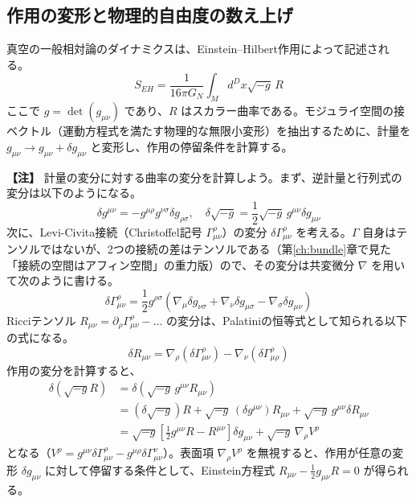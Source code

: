 \documentclass[uplatex, dvipdfmx, book]{jsbook}
\let\origsubsection\subsection
\let\origsubsubsection\subsubsection
\renewcommand{\section}{\origsubsection}
\renewcommand{\subsection}{\origsubsubsection}
\renewcommand{\subsubsection}{\paragraph}
\newenvironment{note}{\vspace{1ex}\par\footnotesize\noindent\textbf{【注】}}{\par\vspace{1ex}}
\begin{document}
\section{作用の変形と物理的自由度の数え上げ}

真空の一般相対論のダイナミクスは、Einstein--Hilbert作用によって記述される。
\begin{equation}
    S_{EH} = \frac{1}{16\pi G_N} \int_M d^D x \sqrt{-g}\, R
\end{equation}
ここで $g = \det(g_{\mu\nu})$ であり、$R$ はスカラー曲率である。モジュライ空間の接ベクトル（運動方程式を満たす物理的な無限小変形）を抽出するために、計量を $g_{\mu\nu} \to g_{\mu\nu} + \delta g_{\mu\nu}$ と変形し、作用の停留条件を計算する。

\begin{note}
計量の変分に対する曲率の変分を計算しよう。まず、逆計量と行列式の変分は以下のようになる。
\begin{equation*}
    \delta g^{\mu\nu} = - g^{\mu\rho} g^{\nu\sigma} \delta g_{\rho\sigma}, \quad \delta \sqrt{-g} = \frac{1}{2} \sqrt{-g}\, g^{\mu\nu} \delta g_{\mu\nu}
\end{equation*}
次に、Levi-Civita接続（Christoffel記号 $\Gamma^\rho_{\mu\nu}$）の変分 $\delta \Gamma^\rho_{\mu\nu}$ を考える。$\Gamma$ 自身はテンソルではないが、2つの接続の差はテンソルである（第\ref{ch:bundle}章で見た「接続の空間はアフィン空間」の重力版）ので、その変分は共変微分 $\nabla$ を用いて次のように書ける。
\begin{equation*}
    \delta \Gamma^\rho_{\mu\nu} = \frac{1}{2} g^{\rho\sigma} \left( \nabla_\mu \delta g_{\nu\sigma} + \nabla_\nu \delta g_{\mu\sigma} - \nabla_\sigma \delta g_{\mu\nu} \right)
\end{equation*}
Ricciテンソル $R_{\mu\nu} = \partial_\rho \Gamma^\rho_{\mu\nu} - \dots$ の変分は、Palatiniの恒等式として知られる以下の式になる。
\begin{equation*}
    \delta R_{\mu\nu} = \nabla_\rho (\delta \Gamma^\rho_{\mu\nu}) - \nabla_\nu (\delta \Gamma^\rho_{\mu\rho})
\end{equation*}
作用の変分を計算すると、
\begin{align*}
    \delta (\sqrt{-g} R) &= \delta (\sqrt{-g}\, g^{\mu\nu} R_{\mu\nu}) \\
    &= (\delta \sqrt{-g}) R + \sqrt{-g}\, (\delta g^{\mu\nu}) R_{\mu\nu} + \sqrt{-g}\, g^{\mu\nu} \delta R_{\mu\nu} \\
    &= \sqrt{-g} \left[ \frac{1}{2} g^{\mu\nu} R - R^{\mu\nu} \right] \delta g_{\mu\nu} + \sqrt{-g}\, \nabla_\rho V^\rho
\end{align*}
となる（$V^\rho = g^{\mu\nu}\delta\Gamma^\rho_{\mu\nu} - g^{\mu\rho}\delta\Gamma^\nu_{\mu\nu}$）。表面項 $\nabla_\rho V^\rho$ を無視すると、作用が任意の変形 $\delta g_{\mu\nu}$ に対して停留する条件として、Einstein方程式 $R_{\mu\nu} - \frac{1}{2} g_{\mu\nu} R = 0$ が得られる。
\end{note}
\end{document}
